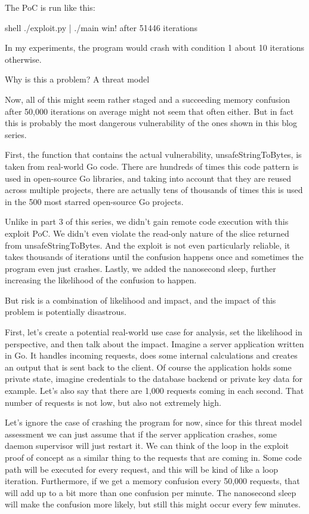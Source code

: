 The PoC is run like this:

shell
 ./exploit.py | ./main
win! after 51446 iterations


In my experiments, the program would crash with condition 1 about 10%
iterations otherwise.


 Why is this a problem? A threat model

Now, all of this might seem rather staged and a succeeding memory confusion after 50,000 iterations on average might not
seem that often either. But in fact this is probably the most dangerous vulnerability of the ones shown in this blog
series.

First, the function that contains the actual vulnerability, unsafeStringToBytes, is taken from real-world Go code.
There are hundreds of times this code pattern is used in open-source Go libraries, and taking into account that they
are reused across multiple projects, there are actually tens of thousands of times this is used in the 500 most starred
open-source Go projects.

Unlike in part 3 of this series, we didn't gain remote code execution with this exploit PoC. We didn't even violate the
read-only nature of the slice returned from unsafeStringToBytes. And the exploit is not even particularly reliable, it
takes thousands of iterations until the confusion happens once and sometimes the program even just crashes. Lastly, we
added the nanosecond sleep, further increasing the likelihood of the confusion to happen.

But risk is a combination of likelihood and impact, and the impact of this problem is potentially disastrous.

First, let's create a potential real-world use case for analysis, set the likelihood in perspective, and then talk
about the impact. Imagine a server application written in Go. It handles incoming requests, does some internal
calculations and creates an output that is sent back to the client. Of course the application holds some private state,
imagine credentials to the database backend or private key data for example. Let's also say that there are 1,000
requests coming in each second. That number of requests is not low, but also not extremely high.

Let's ignore the case of crashing the program for now, since for this threat model assessment we can just assume that
if the server application crashes, some daemon supervisor will just restart it. We can think of the loop in the exploit
proof of concept as a similar thing to the requests that are coming in. Some code path will be executed for every
request, and this will be kind of like a loop iteration. Furthermore, if we get a memory confusion every 50,000 requests,
that will add up to a bit more than one confusion per minute. The nanosecond sleep will make the confusion more likely,
but still this might occur every few minutes.

